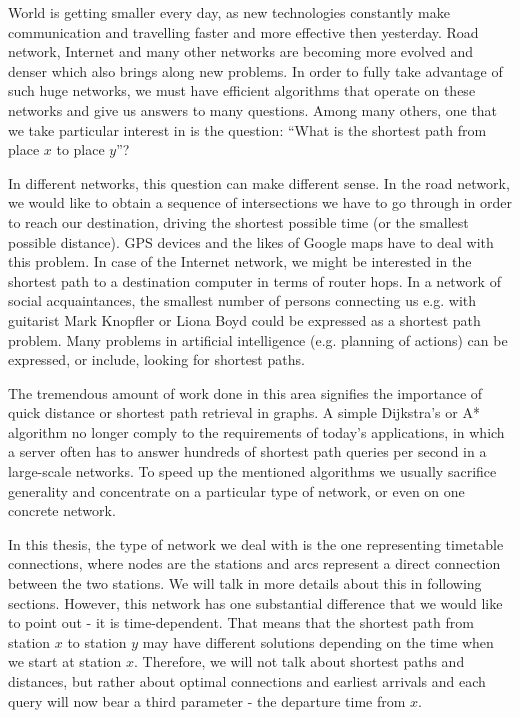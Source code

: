 \noindent World is getting smaller every day, as new technologies constantly make communication and travelling faster and more effective then yesterday. Road network, Internet and many other networks are becoming more evolved and denser which also brings along new problems. In order to fully take advantage of such huge networks, we must have efficient algorithms that operate on these networks and give us answers to many questions. Among many others, one that we take particular interest in is the question: ``What is the shortest path from place $x$ to place $y$''?

In different networks, this question can make different sense. In the road network, we would like to obtain a sequence of intersections we have to go through in order to reach our destination, driving the shortest possible time (or the smallest possible distance). GPS devices and the likes of Google maps have to deal with this problem. In case of the Internet network, we might be interested in the shortest path to a destination computer in terms of router hops. In a network of social acquaintances, the smallest number of persons connecting us e.g. with guitarist Mark Knopfler or Liona Boyd could be expressed as a shortest path problem. Many problems in artificial intelligence (e.g. planning of actions) can be expressed, or include, looking for shortest paths.

The tremendous amount of work done in this area signifies the importance of quick distance or shortest path retrieval in graphs. A simple Dijkstra's or A* algorithm no longer comply to the requirements of today's applications, in which a server often has to answer hundreds of shortest path queries per second in a large-scale networks. To speed up the mentioned algorithms we usually sacrifice generality and concentrate on a particular type of network, or even on one concrete network.

In this thesis, the type of network we deal with is the one representing timetable connections, where nodes are the stations and arcs represent a direct connection between the two stations. We will talk in more details about this in following sections. However, this network has one substantial difference that we would like to point out - it is time-dependent. That means that the shortest path from station $x$ to station $y$ may have different solutions depending on the time when we start at station $x$. Therefore, we will not talk about shortest paths and distances, but rather about optimal connections and earliest arrivals and each query will now bear a third parameter - the departure time from $x$. \\

